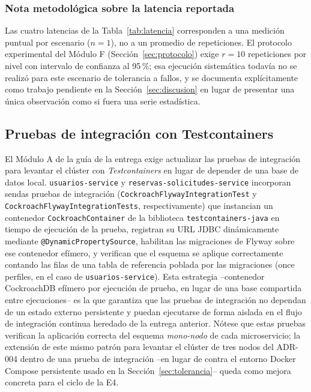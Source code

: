 \documentclass[10pt,twocolumn]{article}
\begin{document}
\subsubsection{Nota metodológica sobre la latencia reportada}

Las cuatro latencias de la Tabla~\ref{tab:latencia} corresponden a una
medición puntual por escenario ($n=1$), no a un promedio de repeticiones.
El protocolo experimental del Módulo F (Sección~\ref{sec:protocolo}) exige
$r=10$ repeticiones por nivel con intervalo de confianza al 95\,\%; esa
ejecución sistemática todavía no se realizó para este escenario de
tolerancia a fallos, y se documenta explícitamente como trabajo pendiente
en la Sección~\ref{sec:discusion} en lugar de presentar una única
observación como si fuera una serie estadística.

\subsection{Pruebas de integración con Testcontainers}

El Módulo A de la guía de la entrega exige actualizar las pruebas de
integración para levantar el clúster con \emph{Testcontainers} en lugar de
depender de una base de datos local. \texttt{usuarios-service} y
\texttt{reservas-solicitudes-service} incorporan sendas pruebas de
integración (\texttt{CockroachFlywayIntegrationTest} y
\texttt{CockroachFlywayIntegrationTests}, respectivamente) que instancian
un contenedor \texttt{CockroachContainer} de la biblioteca
\texttt{testcontainers-java} en tiempo de ejecución de la prueba,
registran su URL JDBC dinámicamente mediante
\texttt{@DynamicPropertySource}, habilitan las migraciones de Flyway sobre
ese contenedor efímero, y verifican que el esquema se aplique
correctamente contando las filas de una tabla de referencia poblada por
las migraciones (once perfiles, en el caso de
\texttt{usuarios-service}). Esta estrategia --contenedor CockroachDB
efímero por ejecución de prueba, en lugar de una base compartida entre
ejecuciones-- es la que garantiza que las pruebas de integración no
dependan de un estado externo persistente y puedan ejecutarse de forma
aislada en el flujo de integración continua heredado de la entrega
anterior. Nótese que estas pruebas verifican la aplicación correcta del
esquema \emph{mono-nodo} de cada microservicio; la extensión de este mismo
patrón para levantar el clúster de tres nodos del ADR-004 dentro de una
prueba de integración --en lugar de contra el entorno Docker Compose
persistente usado en la Sección~\ref{sec:tolerancia}-- queda como mejora
concreta para el ciclo de la E4.
\end{document}
